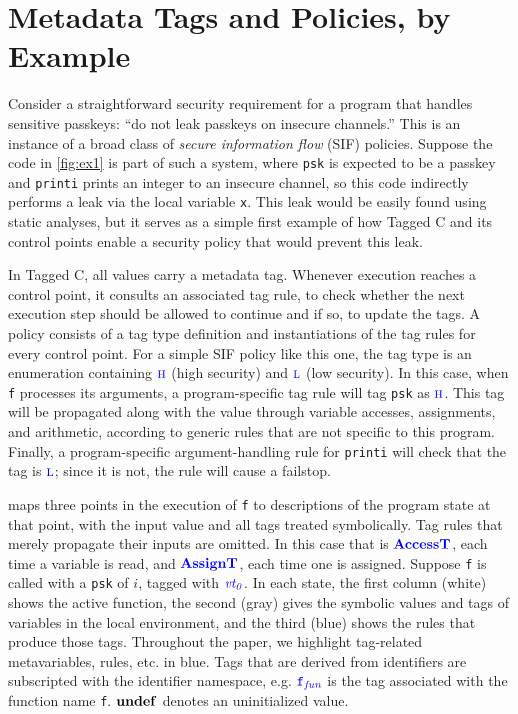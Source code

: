 \documentclass{llncs}
\begin{document}
\section{Metadata Tags and Policies, by Example}
\label{sec:example}

Consider a straightforward security requirement for a program that handles sensitive passkeys:
``do not leak passkeys on insecure channels.'' This is an instance of a broad class of
{\em secure information flow} (SIF) policies. Suppose the code in \cref{fig:ex1} is part of
such a system, where {\tt psk} is expected to be a passkey and {\tt printi}
prints an integer to an insecure channel, so this code indirectly performs a leak via the
local variable {\tt x}. This leak would be easily found using static analyses, but it serves
as a simple first example of how Tagged C and its control points
enable a security policy that would prevent this leak.

In Tagged C, all values carry a metadata tag. Whenever execution reaches a control point, it consults
an associated tag rule, to check whether the next execution step should be allowed to continue and
if so, to update the tags. A policy consists of a tag type definition and instantiations of the tag rules for every control point.
For a simple SIF policy like this one, the tag type is an enumeration containing \(\high\) (high security) and \(\low\) (low security).
In this case, when {\tt f} processes its arguments, a program-specific tag rule 
will tag {\tt psk} as \(\high\). This tag will be propagated along with the value through variable accesses,
assignments, and arithmetic, according to generic rules that are not specific to this program.
Finally, a program-specific argument-handling rule for {\tt printi} will check that the tag is \(\low\);
since it is not, the rule will cause a failstop.

 maps three points in the execution of {\tt f} to descriptions of the program
state at that point, with the input value and all tags treated symbolically. 
Tag rules that merely propagate their inputs are omitted. In this case that is \(\accesstname\),
each time a variable is read, and \(\assigntname\), each time one is assigned.
Suppose {\tt f} is called with a {\tt psk} of \(i\), tagged with \(\vt[_0]\).
In each state, the first column (white) shows the active function, the second (gray) gives the symbolic values and tags
of variables in the local environment, and the third (blue) shows the rules that produce those tags.
Throughout the paper, we highlight tag-related metavariables, rules, etc. in {\color{blue}blue}.
Tags that are derived from identifiers are subscripted with the identifier namespace, e.g.
\(\FN[f]\) is the tag associated with the function name {\tt f}. \(\vundef\) denotes an
uninitialized value.
\end{document}
